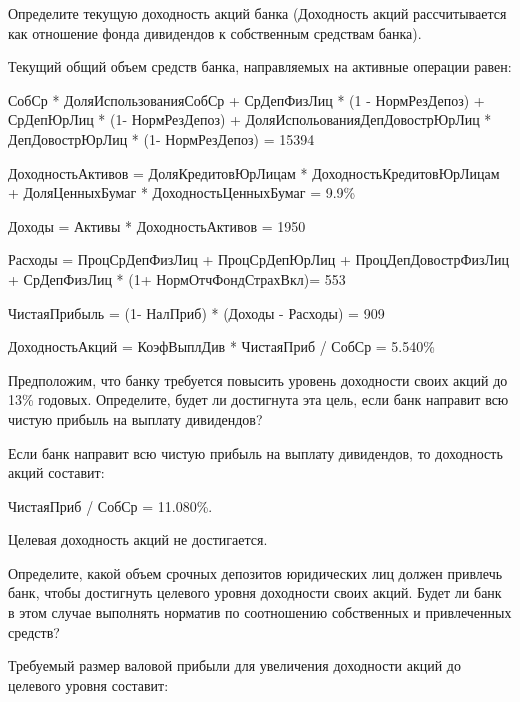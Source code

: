 \documentclass[12pt, table]{exam}
\begin{document}
\begin{questions}
\pagebreak
\begin{subparts}
	\subpart[5] Определите текущую доходность акций банка (Доходность акций рассчитывается как отношение фонда дивидендов к собственным средствам банка). 
	
	\begin{solution}[6em]
		
		Текущий общий объем средств банка, направляемых на активные операции равен:
		
		СобСр * ДоляИспользованияСобСр + СрДепФизЛиц * (1 - НормРезДепоз) + СрДепЮрЛиц * (1- НормРезДепоз)  + ДоляИспольованияДепДовострЮрЛиц * ДепДовострЮрЛиц * (1- НормРезДепоз) = 15394
		
		
		ДоходностьАктивов = ДоляКредитовЮрЛицам * ДоходностьКредитовЮрЛицам + ДоляЦенныхБумаг * ДоходностьЦенныхБумаг = 9.9\%
		
		Доходы = Активы * ДоходностьАктивов = 1950
		
		Расходы = ПроцСрДепФизЛиц + ПроцСрДепЮрЛиц + ПроцДепДовострФизЛиц + 
			СрДепФизЛиц * (1+ НормОтчФондСтрахВкл)= 553
		
		ЧистаяПрибыль = (1- НалПриб) * (Доходы - Расходы) = 909
				
		ДоходностьАкций = КоэфВыплДив * ЧистаяПриб / СобСр = 5.540\%
				
	\end{solution}
	
	\subpart[5] Предположим, что банку требуется повысить уровень доходности своих акций до 13\% годовых. Определите, будет ли достигнута эта цель, если банк направит всю чистую прибыль на выплату дивидендов?
	
	\begin{solution}[6em]
		
		Если банк направит всю чистую прибыль на выплату дивидендов, то доходность акций составит:
		
		ЧистаяПриб / СобСр = 11.080\%.
		
		Целевая доходность акций не достигается.
	\end{solution}

	\subpart[10] Определите, какой объем срочных депозитов юридических лиц должен привлечь банк, чтобы достигнуть целевого уровня доходности своих акций. Будет ли банк в этом случае выполнять норматив по соотношению собственных и привлеченных средств?
	
	\begin{solution}[6em]
		
		Требуемый размер валовой прибыли для увеличения доходности акций до целевого уровня составит:
		

\end{solution}
\end{subparts}
\end{questions}
\end{document}
